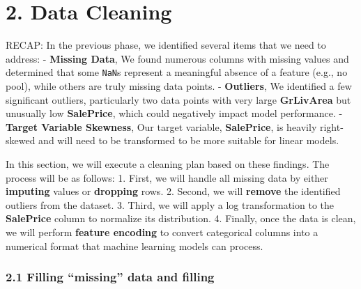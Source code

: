 \documentclass[11pt]{article}
\begin{document}
    \section{2. Data Cleaning}\label{data-cleaning}

    RECAP: In the previous phase, we identified several items that we need
to address: - \textbf{Missing Data}, We found numerous columns with
missing values and determined that some \texttt{NaN}s represent a
meaningful absence of a feature (e.g., no pool), while others are truly
missing data points. - \textbf{Outliers}, We identified a few
significant outliers, particularly two data points with very large
\textbf{GrLivArea} but unusually low \textbf{SalePrice}, which could
negatively impact model performance. - \textbf{Target Variable
Skewness}, Our target variable, \textbf{SalePrice}, is heavily
right-skewed and will need to be transformed to be more suitable for
linear models.

In this section, we will execute a cleaning plan based on these
findings. The process will be as follows: 1. First, we will handle all
missing data by either \textbf{imputing} values or \textbf{dropping}
rows. 2. Second, we will \textbf{remove} the identified outliers from
the dataset. 3. Third, we will apply a log transformation to the
\textbf{SalePrice} column to normalize its distribution. 4. Finally,
once the data is clean, we will perform \textbf{feature encoding} to
convert categorical columns into a numerical format that machine
learning models can process.

    \subsubsection{2.1 Filling ``missing'' data and
filling}\label{filling-missing-data-and-filling}
\end{document}
